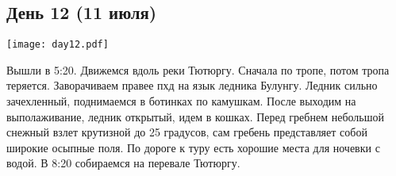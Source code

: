 \graphicspath{{Pictures/Chapter5/Day12}}


\subsection{День 12 (11 июля)}\label{subsec:Day12}
    \parbox[c]{\textwidth}{%
        \texttt{[image: day12.pdf]}\label{fig:Day12_map}%
    }
    \vspace{0.8cm}

Вышли в 5:20. Движемся вдоль реки Тютюргу. Сначала по тропе, потом тропа теряется. Заворачиваем правее пхд на язык ледника Булунгу. Ледник сильно зачехленный, поднимаемся в ботинках по камушкам. После выходим на выполаживание, ледник открытый, идем в кошках. Перед гребнем небольшой снежный взлет крутизной до 25 градусов, сам гребень представляет собой широкие осыпные поля. По дороге к туру есть хорошие места для ночевки с водой. В 8:20 собираемся на перевале Тютюргу.

